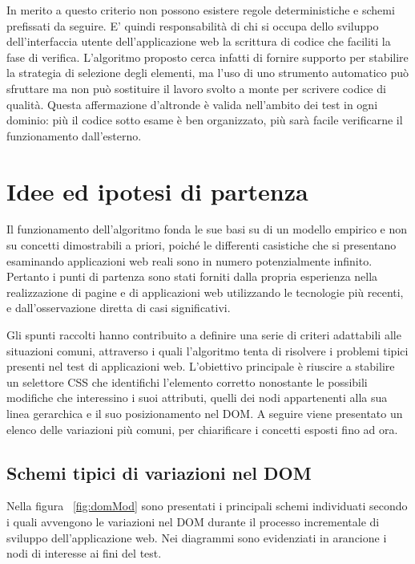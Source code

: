 \documentclass[12pt]{toptesi}
\begin{document}
In merito a questo criterio non possono esistere regole deterministiche e schemi prefissati da seguire. E' quindi responsabilità di chi si occupa dello sviluppo dell'interfaccia utente dell'applicazione web la scrittura di codice che faciliti la fase di verifica. L'algoritmo proposto cerca infatti di fornire supporto per stabilire la strategia di selezione degli elementi, ma l'uso di uno strumento automatico può sfruttare ma non può sostituire il lavoro svolto a monte per scrivere codice di qualità. Questa affermazione d'altronde è valida nell'ambito dei test in ogni dominio: più il codice sotto esame è ben organizzato, più sarà facile verificarne il funzionamento dall'esterno.

\section{Idee ed ipotesi di partenza}

Il funzionamento dell'algoritmo fonda le sue basi su di un modello empirico e non su concetti dimostrabili a priori, poiché le differenti casistiche che si presentano esaminando applicazioni web reali sono in numero potenzialmente infinito. Pertanto i punti di partenza sono stati forniti dalla propria esperienza nella realizzazione di pagine e di applicazioni web utilizzando le tecnologie più recenti, e dall'osservazione diretta di casi significativi.

Gli spunti raccolti hanno contribuito a definire una serie di criteri adattabili alle situazioni comuni, attraverso i quali l'algoritmo tenta di risolvere i problemi tipici presenti nel test di applicazioni web. L'obiettivo principale è riuscire a stabilire un selettore CSS che identifichi l'elemento corretto nonostante le possibili modifiche che interessino i suoi attributi, quelli dei nodi appartenenti alla sua linea gerarchica e il suo posizionamento nel DOM. A seguire viene presentato un elenco delle variazioni più comuni, per chiarificare i concetti esposti fino ad ora.

\subsection {Schemi tipici di variazioni nel DOM}

Nella figura ~\ref{fig:domMod} sono presentati i principali schemi individuati secondo i quali avvengono le variazioni nel DOM durante il processo incrementale di sviluppo dell'applicazione web. Nei diagrammi sono evidenziati in arancione i nodi di interesse ai fini del test. 
\end{document}
